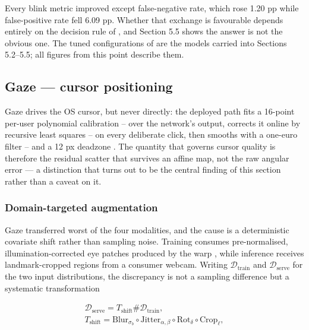 Every blink metric improved except false-negative rate, which rose 1.20 pp while false-positive rate fell 6.09 pp. Whether that exchange is favourable depends entirely on the decision rule of , and Section 5.5 shows the answer is not the obvious one. The tuned configurations of  are the models carried into Sections 5.2--5.5; all figures from this point describe them.

\FloatBarrier

\subsection{Gaze --- cursor positioning}

Gaze drives the OS cursor, but never directly: the deployed path fits a 16-point per-user polynomial calibration -- over the network's output, corrects it online by recursive least squares -- on every deliberate click, then smooths with a one-euro filter -- and a 12 px deadzone . The quantity that governs cursor quality is therefore the residual scatter that survives an affine map, not the raw angular error --- a distinction that turns out to be the central finding of this section rather than a caveat on it.

\subsubsection{Domain-targeted augmentation}

Gaze transferred worst of the four modalities, and the cause is a deterministic covariate shift rather than sampling noise. Training consumes pre-normalised, illumination-corrected eye patches produced by the warp , while inference receives landmark-cropped regions from a consumer webcam. Writing $\mathcal{D}_{\mathrm{train}}$ and $\mathcal{D}_{\mathrm{serve}}$ for the two input distributions, the discrepancy is not a sampling difference but a systematic transformation

\begin{equation}
\label{eq:185}
\begin{aligned}
\mathcal{D}_{\mathrm{serve}} = T_{\mathrm{shift}} \# \mathcal{D}_{\mathrm{train}} , \\
T_{\mathrm{shift}} = \mathrm{Blur}_{\sigma _b} \circ \mathrm{Jitter}_{\alpha ,\beta } \circ \mathrm{Rot}_{\delta} \circ \mathrm{Crop}_{\ell} ,
\end{aligned}
\end{equation}

